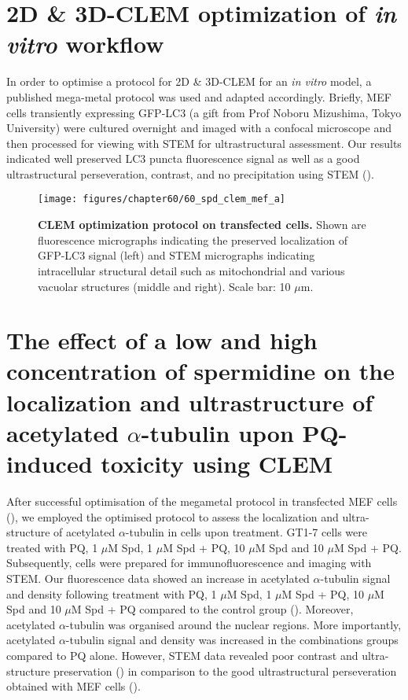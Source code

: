 \section{2D \& 3D-CLEM optimization of \textit{in vitro} workflow}
In order to optimise a protocol for 2D \& 3D-CLEM for an \textit{in vitro} model, a published mega-metal protocol was used \citep{Russell2017} and adapted accordingly. Briefly, MEF cells transiently expressing GFP-LC3 (a gift from Prof Noboru Mizushima, Tokyo University) were cultured overnight and imaged with a confocal microscope and then processed for viewing with STEM for ultrastructural assessment. Our results indicated well preserved LC3 puncta fluorescence signal as well as a good ultrastructural perseveration, contrast, and no precipitation using STEM (). 

\begin{figure}[!htbp]
\center
  \texttt{[image: figures/chapter60/60\_spd\_clem\_mef\_a]}
  \caption[CLEM optimization protocol on transfected cells]{\textbf{CLEM optimization protocol on transfected cells.} Shown are fluorescence micrographs indicating the preserved localization of GFP-LC3 signal (left) and STEM micrographs indicating intracellular structural detail such as mitochondrial and various vacuolar structures (middle and right). Scale bar: 10 $\mu$m.}
  \label{fig:60_spd_clem_mef_a}
\end{figure} 

\section{The effect of a low and high concentration of spermidine on the localization and ultrastructure of acetylated $\alpha$-tubulin upon PQ-induced toxicity using CLEM}
\label{sec:Effect_low_high_spermidine_localization_ultrastructure of_tubulin_CLEM}
After successful optimisation of the megametal protocol in transfected MEF cells (), we employed the optimised protocol to assess the localization and ultra-structure of acetylated $\alpha$-tubulin in cells upon treatment. GT1-7 cells were treated with PQ, 1 $\mu$M Spd,  1 $\mu$M Spd + PQ, 10 $\mu$M Spd and 10 $\mu$M Spd + PQ. Subsequently, cells were prepared for immunofluorescence and imaging with STEM. Our fluorescence data showed an increase in acetylated $\alpha$-tubulin signal and density following treatment with PQ, 1 $\mu$M Spd, 1 $\mu$M Spd + PQ, 10 $\mu$M Spd and 10 $\mu$M Spd + PQ compared to the control group ().  Moreover, acetylated  $\alpha$-tubulin was  organised around the nuclear regions. More importantly, acetylated $\alpha$-tubulin signal and density was increased in the combinations groups compared to PQ alone. However, STEM data revealed poor contrast and ultra-structure preservation () in comparison to the good ultrastructural perseveration obtained with MEF cells (). 

